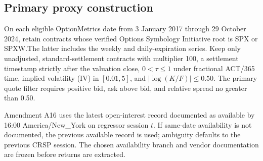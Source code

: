 \documentclass[11pt]{article}
\begin{document}
\subsection{Primary proxy construction}

On each eligible OptionMetrics date from 3 January 2017 through 29 October 2024, retain
contracts whose verified Options Symbology Initiative root is SPX or SPXW.\@ The latter
includes the weekly and daily-expiration series.  Keep only unadjusted, standard-settlement
contracts with multiplier 100, a settlement timestamp strictly after the valuation close,
$0<\tau\leq1$ under fractional ACT/365 time, implied volatility (IV) in $[0.01,5]$, and
$|\log(K/F)|\leq0.50$.  The primary quote filter requires positive bid, ask above bid, and
relative spread no greater than 0.50.

Amendment A16 uses the latest open-interest record documented as available by 16:00
America/New\_York on regressor session $t$.  If same-date availability is not documented,
the previous available record is used; ambiguity defaults to the previous CRSP session.
The chosen availability branch and vendor documentation are frozen before returns are
extracted.
\end{document}
